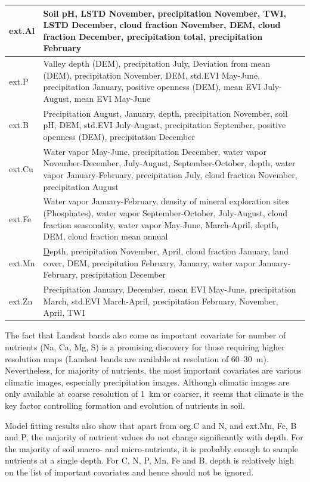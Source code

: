 \begin{linenumbers}
\begin{table}
{\begin{tabular}{m{}m{}}
ext.\@ Al  & Soil pH, LSTD November, precipitation November, TWI, LSTD December, cloud fraction November, DEM, cloud fraction December, precipitation total, precipitation February   \\ \midrule
ext.\@ P   & Valley depth (DEM), precipitation July, Deviation from mean (DEM), precipitation November, DEM, std.\@ EVI May-June, precipitation January, positive openness (DEM), mean EVI July-August, mean EVI May-June  \\ \midrule
ext.\@ B   & Precipitation August, January, depth, precipitation November, soil pH, DEM, std.\@ EVI July-August, precipitation September, positive openness (DEM), precipitation December  \\ \midrule
ext.\@ Cu  & Water vapor May-June, precipitation December, water vapor November-December, July-August, September-October, depth, water vapor January-February, precipitation July, cloud fraction November, precipitation August   \\ \midrule
ext.\@ Fe  & Water vapor January-February, density of mineral exploration sites (Phosphates), water vapor September-October, July-August, cloud fraction seasonality, water vapor May-June, March-April, depth, DEM, cloud fraction mean annual \\ \midrule
ext.\@ Mn  & {\ul Depth}, precipitation November, April, cloud fraction January, land cover, DEM, precipitation February, January, water vapor January-February, precipitation December   \\ \midrule
ext.\@ Zn  & Precipitation January, December, mean EVI May-June, precipitation March, std.\@ EVI March-April, precipitation February, November, April, TWI   \\
\bottomrule
\end{tabular}
}
\end{table}

The fact that Landsat bands also come as important covariate for number of nutrients (Na, Ca, Mg, S) is a promising discovery for those requiring higher resolution maps (Landsat bands are available at resolution of 60--\SI{30}{\meter}). Nevertheless, for majority of nutrients, the most important covariates are various climatic images, especially precipitation images. Although climatic images are only available at coarse resolution of \SI{1}{\kilo\meter} or coarser, it seems that climate is the key factor controlling formation and evolution of nutrients in soil. \par

Model fitting results also show that apart from org.\@ C and N, and ext.\@ Mn, Fe, B and P, the majority of nutrient values do not change significantly with depth. For the majority of soil macro- and micro-nutrients, it is probably enough to sample nutrients at a single depth. For C, N, P, Mn, Fe and B, depth is relatively high on the list of important covariates and hence should not be ignored. \par


\end{linenumbers}
